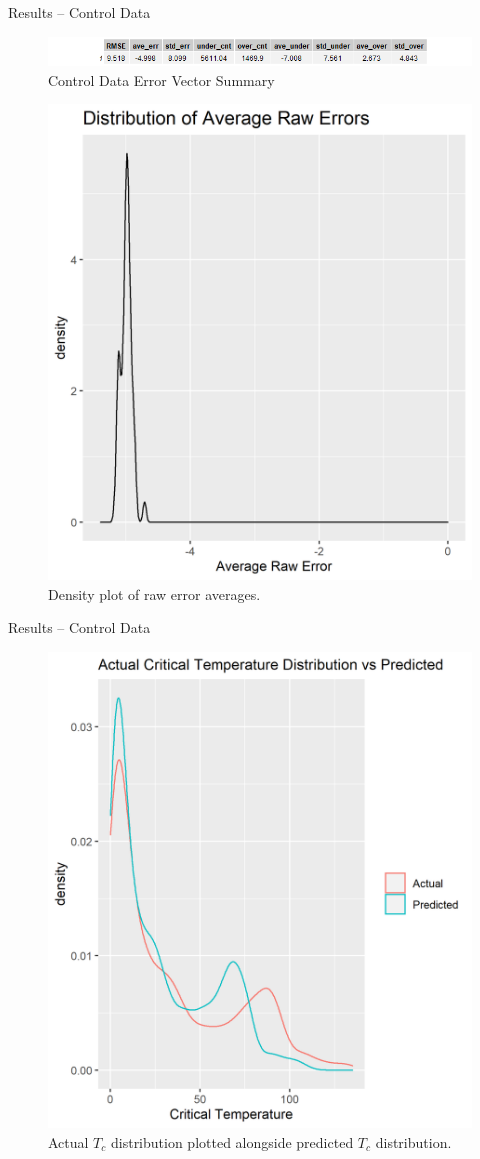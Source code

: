 \documentclass{beamer}
\begin{document}
  \begin{frame}{Results -- Control Data}
       \begin{figure}[h]
     \centering
     \includegraphics[width = \linewidth]{Control_tbl.png}
     \caption{Control Data Error Vector Summary}
     \label{fig:control_table}
 \end{figure}
 \begin{figure}
     \centering
     \includegraphics[width=0.35\linewidth]{control_ave_err_density.png}
     \caption{Density plot of raw error averages.}
     \label{fig:cntrl_ave_err}
 \end{figure}
  \end{frame}
  \begin{frame}{Results -- Control Data}
      \begin{figure}
          \centering
          \includegraphics[width=0.5\linewidth]{Actual_vs_Pred_dist.png}
          \caption{Actual $T_c$ distribution plotted alongside predicted $T_c$ distribution.}
          \label{fig:comparsion_dist}
      \end{figure}
  \end{frame}
  
\end{document}

